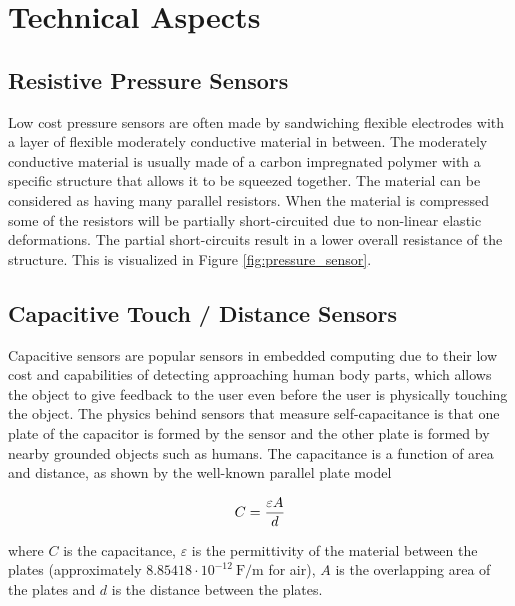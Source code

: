 \documentclass{sigchi-ext}
\begin{document}
\section{Technical Aspects}
\subsection{Resistive Pressure Sensors}
Low cost pressure sensors are often made by sandwiching flexible electrodes
with a layer of flexible moderately conductive material in between. The
moderately conductive material is usually made of a carbon impregnated polymer
with a specific structure that allows it to be squeezed together. The material
can be considered as having many parallel resistors. When the material is
compressed some of the resistors will be partially short-circuited due to
non-linear elastic deformations. The partial short-circuits result in a lower
overall resistance of the structure. This is visualized
in Figure \ref{fig:pressure_sensor}.



\subsection{Capacitive Touch / Distance Sensors}
Capacitive sensors are popular sensors in embedded computing due to their low cost
and capabilities of detecting approaching human body parts, which allows the
object to give feedback to the user even before the user is physically touching
the object. The physics behind sensors that measure self-capacitance is that one
plate of the capacitor is formed by the sensor and the other plate is formed by
nearby grounded objects such as humans. The capacitance is a function of area
and distance, as shown by the well-known parallel plate model

\begin{equation}
C = {{\varepsilon A} \over {d}}
\end{equation}

where $C$ is the capacitance, $\varepsilon$ is the permittivity of the material
between the plates (approximately $8.85418 \cdot 10^{-12} ~ \textrm{F/m}$ for
air), $A$ is the overlapping area of the plates and $d$ is the distance between
the plates.
\end{document}
